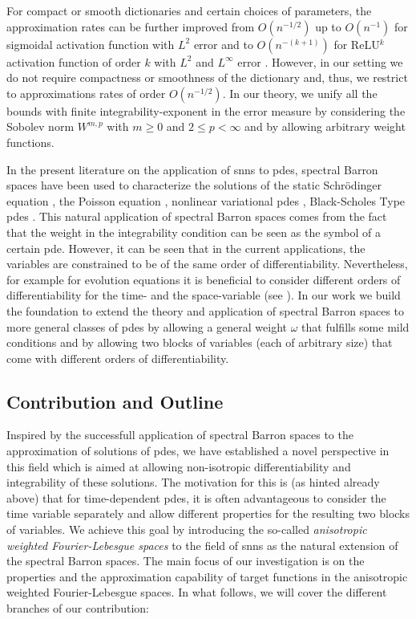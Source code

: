 \documentclass[a4paper]{article}
\numberwithin{equation}{section}
\theoremstyle{remark}
\begin{document}
For compact or smooth dictionaries and certain choices of parameters, the approximation rates can be further improved from $O(n^{-1/2})$ up to $O(n^{-1})$ for sigmoidal activation function with $L^2$ error \cite{Makovoz96RandomApproximantsNeural} and to $O(n^{-(k+1)})$ for ReLU$^k$ activation function of order $k$ with $L^2$ \cite{Siegel22HighOrderApproximationRates} and $L^\infty$ error \cite{Ma22UniformApproximationRates}.
However, in our setting we do not require compactness or smoothness
of the dictionary and, thus,
we restrict to approximations rates of order $O(n^{-1/2})$.
In our theory, we unify all the bounds with finite integrability-exponent 
in the error measure
by considering the Sobolev norm $W^{m,p}$
with $m\geq0$ and $2\leq p<\infty$
and by allowing arbitrary weight functions.

In the present literature on the application of \glspl{snn} to \glspl{pde},
spectral Barron spaces have been used to characterize the solutions of
the
static Schr\"{o}dinger equation 
\cite{Lu21PrioriGeneralizationAnalysis,Chen23RegularityTheoryStatic},
the Poisson equation
\cite{Lu21PrioriGeneralizationAnalysis},
nonlinear variational \glspl{pde} \cite{Marwah23NeuralNetworkApproximations},
Black-Scholes Type \glspl{pde}
\cite{Gonon23RandomFeatureNeural}.
This natural application of spectral Barron spaces
comes from the fact that the weight in the integrability condition
can be seen as the symbol of a certain \gls{pde}.
However, it can be seen that in the current applications,
the variables are constrained to be of the same order of differentiability.
Nevertheless, for example for evolution equations
it is beneficial to consider different orders of differentiability
for the time- and the space-variable (see \cite[Chapter 7]{Evans22PartialDifferentialEquations}).
In our work we build the foundation to extend the theory
and application of spectral Barron spaces
to more general classes of \glspl{pde}
by allowing a general weight $\omega$ that fulfills some mild conditions
and by allowing two blocks of variables (each of arbitrary size)
that come with different orders of differentiability.

\subsection{Contribution and Outline}
Inspired by the successfull application of spectral Barron spaces
to the approximation of solutions of \glspl{pde},
we have established a novel perspective in this field which is aimed at allowing
non-isotropic differentiability and integrability of these solutions.
The motivation for this is (as hinted already above) that
for time-dependent \glspl{pde},
it is often advantageous to consider the time variable separately
and allow different properties for the resulting two blocks of variables.
We achieve this goal by introducing the so-called
\emph{anisotropic weighted Fourier-Lebesgue spaces}
to the field of \glspl{snn}
as the natural extension
of the spectral Barron spaces.
The main focus of our investigation is on the
properties and the approximation capability of target functions
in the anisotropic weighted Fourier-Lebesgue spaces.
In what follows, we will cover the different branches of our contribution:
\end{document}
